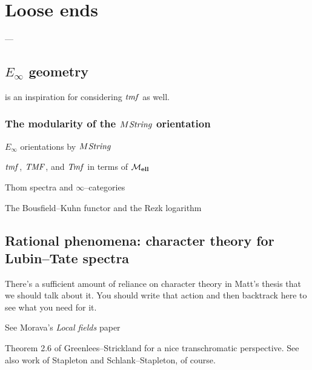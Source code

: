 
\chapter{Loose ends}

---


\section{\texorpdfstring{$E_\infty$}{Eoo} geometry}

 is an inspiration for considering $\mathit{tmf}$ as well.



\subsection*{The modularity of the $M\mathit{String}$ orientation}

$E_\infty$ orientations by $M\mathit{String}$

$\mathit{tmf}$, $\mathit{TMF}$, and $\mathit{Tmf}$ in terms of $\mathcal{M}_{\mathbf{ell}}$

Thom spectra and $\infty$--categories

The Bousfield--Kuhn functor and the Rezk logarithm




\section{Rational phenomena: character theory for Lubin--Tate spectra}

There's a sufficient amount of reliance on character theory in Matt's thesis that we should talk about it.  You should write that action and then backtrack here to see what you need for it.

See Morava's \textit{Local fields} paper

\begin{remark}
Theorem 2.6 of Greenlees--Strickland for a nice transchromatic perspective.  See also work of Stapleton and Schlank--Stapleton, of course.
\end{remark}


